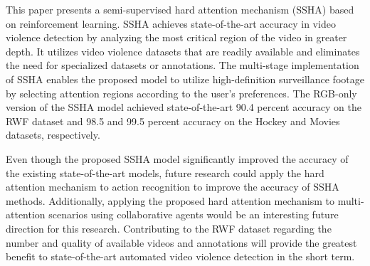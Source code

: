 \documentclass[review]{elsarticle}
\begin{document}
{
This paper presents a semi-supervised hard attention mechanism (SSHA) based on reinforcement learning. SSHA achieves state-of-the-art accuracy in video violence detection by analyzing the most critical region of the video in greater depth. It utilizes video violence datasets that are readily available and eliminates the need for specialized datasets or annotations. The multi-stage implementation of SSHA enables the proposed model to utilize high-definition surveillance footage by selecting attention regions according to the user's preferences. The RGB-only version of the SSHA model achieved state-of-the-art 90.4 percent accuracy on the RWF dataset and 98.5 and 99.5 percent accuracy on the Hockey and Movies datasets, respectively.

Even though the proposed SSHA model significantly improved the accuracy of the existing state-of-the-art models, future research could apply the hard attention mechanism to action recognition to improve the accuracy of SSHA methods. Additionally, applying the proposed hard attention mechanism to multi-attention scenarios using collaborative agents would be an interesting future direction for this research. Contributing to the RWF dataset regarding the number and quality of available videos and annotations will provide the greatest benefit to state-of-the-art automated video violence detection in the short term.
}



\end{document}
